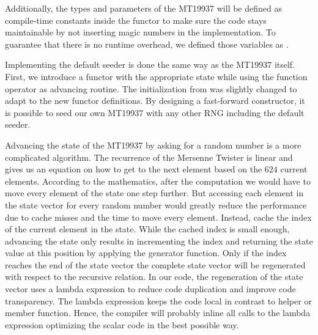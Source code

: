 \documentclass{stdlocal}
\begin{document}
    Additionally, the types and parameters of the MT19937 will be defined as compile-time constants inside the functor to make sure the code stays maintainable by not inserting magic numbers in the implementation.
    To guarantee that there is no runtime overhead, we defined those variables as .

    Implementing the default seeder is done the same way as the MT19937 itself.
    First, we introduce a functor with the appropriate state while using the function operator as advancing routine.
    The initialization from \textcite{kneusel2018} was slightly changed to adapt to the new functor definitions.
    By designing a fast-forward constructor, it is possible to seed our own MT19937 with any other RNG including the default seeder.

    Advancing the state of the MT19937 by asking for a random number is a more complicated algorithm.
    The recurrence of the Mersenne Twister is linear and gives us an equation on how to get to the next element based on the $624$ current elements.
    According to the mathematics, after the computation we would have to move every element of the state one step further.
    But accessing each element in the state vector for every random number would greatly reduce the performance due to cache misses and the time to move every element.
    Instead, \citeauthor{matsumoto1998} cache the index of the current element in the state.
    While the cached index is small enough, advancing the state only results in incrementing the index and returning the state value at this position by applying the generator function.
    Only if the index reaches the end of the state vector the complete state vector will be regenerated with respect to the recursive relation.
    In our code, the regeneration of the state vector uses a lambda expression to reduce code duplication and improve code transparency.
    The lambda expression keeps the code local in contrast to helper or member function.
    Hence, the compiler will probably inline all calls to the lambda expression optimizing the scalar code in the best possible way.
\end{document}

